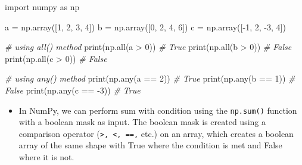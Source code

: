 \documentclass[11pt]{article}
\providecommand{\tightlist}{%
      \setlength{\itemsep}{0pt}\setlength{\parskip}{0pt}}
\newenvironment{Shaded}{}{}
\newcommand{\DecValTok}[1]{\textcolor[rgb]{0.25,0.63,0.44}{{#1}}}
\newcommand{\CommentTok}[1]{\textcolor[rgb]{0.38,0.63,0.69}{\textit{{#1}}}}
\newcommand{\NormalTok}[1]{{#1}}
\newcommand{\ImportTok}[1]{{#1}}
\newcommand{\OperatorTok}[1]{\textcolor[rgb]{0.40,0.40,0.40}{{#1}}}
\newcommand{\BuiltInTok}[1]{{#1}}
\begin{document}
\begin{Shaded}
\begin{Highlighting}[]
\ImportTok{import}\NormalTok{ numpy }\ImportTok{as}\NormalTok{ np}

\NormalTok{a }\OperatorTok{=}\NormalTok{ np.array([}\DecValTok{1}\NormalTok{, }\DecValTok{2}\NormalTok{, }\DecValTok{3}\NormalTok{, }\DecValTok{4}\NormalTok{])}
\NormalTok{b }\OperatorTok{=}\NormalTok{ np.array([}\DecValTok{0}\NormalTok{, }\DecValTok{2}\NormalTok{, }\DecValTok{4}\NormalTok{, }\DecValTok{6}\NormalTok{])}
\NormalTok{c }\OperatorTok{=}\NormalTok{ np.array([}\OperatorTok{{-}}\DecValTok{1}\NormalTok{, }\DecValTok{2}\NormalTok{, }\OperatorTok{{-}}\DecValTok{3}\NormalTok{, }\DecValTok{4}\NormalTok{])}

\CommentTok{\# using all() method}
\BuiltInTok{print}\NormalTok{(np.}\BuiltInTok{all}\NormalTok{(a }\OperatorTok{\textgreater{}} \DecValTok{0}\NormalTok{))   }\CommentTok{\# True}
\BuiltInTok{print}\NormalTok{(np.}\BuiltInTok{all}\NormalTok{(b }\OperatorTok{\textgreater{}} \DecValTok{0}\NormalTok{))   }\CommentTok{\# False}
\BuiltInTok{print}\NormalTok{(np.}\BuiltInTok{all}\NormalTok{(c }\OperatorTok{\textgreater{}} \DecValTok{0}\NormalTok{))   }\CommentTok{\# False}

\CommentTok{\# using any() method}
\BuiltInTok{print}\NormalTok{(np.}\BuiltInTok{any}\NormalTok{(a }\OperatorTok{==} \DecValTok{2}\NormalTok{))  }\CommentTok{\# True}
\BuiltInTok{print}\NormalTok{(np.}\BuiltInTok{any}\NormalTok{(b }\OperatorTok{==} \DecValTok{1}\NormalTok{))  }\CommentTok{\# False}
\BuiltInTok{print}\NormalTok{(np.}\BuiltInTok{any}\NormalTok{(c }\OperatorTok{==} \OperatorTok{{-}}\DecValTok{3}\NormalTok{)) }\CommentTok{\# True}
\end{Highlighting}
\end{Shaded}

\begin{itemize}
\tightlist
\item
  In NumPy, we can perform sum with condition using the
  \texttt{np.sum()} function with a boolean mask as input. The boolean
  mask is created using a comparison operator
  (\texttt{\textgreater{},\ \textless{},\ ==,} etc.) on an array, which
  creates a boolean array of the same shape with True where the
  condition is met and False where it is not.
\end{itemize}
\end{document}
